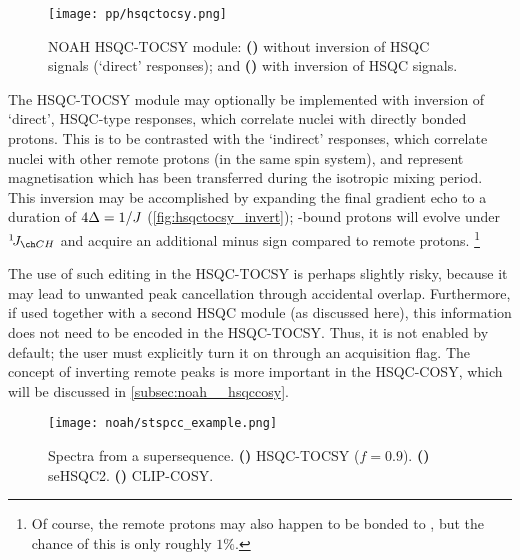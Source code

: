 \begin{figure}[!ht]
    \centering
    \texttt{[image: pp/hsqctocsy.png]}%
    {\label{fig:hsqctocsy_base}}%
    {\label{fig:hsqctocsy_invert}}%
    \caption[NOAH HSQC-TOCSY module]{
        NOAH HSQC-TOCSY module:
        \textbf{()} without inversion of HSQC signals (`direct' responses); and
        \textbf{()} with inversion of HSQC signals.
    }
    \label{fig:hsqctocsy}
\end{figure}

The HSQC-TOCSY module may optionally be implemented with inversion of `direct', HSQC-type responses, which correlate \carbon{} nuclei with directly bonded protons.
This is to be contrasted with the `indirect' responses, which correlate \carbon{} nuclei with other remote protons (in the same spin system), and represent magnetisation which has been transferred during the isotropic mixing period.
This inversion may be accomplished by expanding the final gradient echo to a duration of $4\Delta = 1/J\/$ (\cref{fig:hsqctocsy_invert}); \carbon{}-bound protons will evolve under $\oneJ{CH}$ and acquire an additional minus sign compared to remote protons.%
\footnote{Of course, the remote protons may also happen to be bonded to \carbon{}, but the chance of this is only roughly $1\%$.}

The use of such editing in the HSQC-TOCSY is perhaps slightly risky, because it may lead to unwanted peak cancellation through accidental overlap.
Furthermore, if used together with a second HSQC module (as discussed here), this information does not need to be encoded in the HSQC-TOCSY.
Thus, it is not enabled by default; the user must explicitly turn it on through an acquisition flag.
The concept of inverting remote peaks is more important in the HSQC-COSY, which will be discussed in \cref{subsec:noah__hsqccosy}.

\begin{figure}[!ht]
    \centering
    \texttt{[image: noah/stspcc\_example.png]}%
    {\label{fig:stspcc_example_st}}%
    {\label{fig:stspcc_example_sp}}%
    {\label{fig:stspcc_example_cc}}%
    \caption[Spectra from a  supersequence]{
        Spectra from a  supersequence.
        \textbf{()} HSQC-TOCSY ($f = 0.9$).
        \textbf{()} seHSQC2.
        \textbf{()} CLIP-COSY.
    }
    \label{fig:stspcc_example}
\end{figure}

